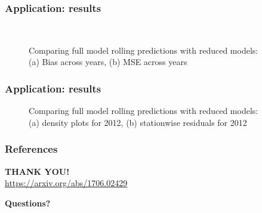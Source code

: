 \documentclass[10pt]{beamer}
\theoremstyle{definition}
\newcommand{\colubf}{\color{UniBlue}\bf}
\begin{document}

\begin{frame}
\frametitle{Application: results}

\begin{figure}[t]
\captionsetup{justification=centering, font=footnotesize}
\begin{center}
\\
\caption{Comparing full model rolling predictions with reduced models:\\
(a) Bias across years, (b) MSE across years}
\label{fig:prepost1}
\end{center}
\end{figure}
\end{frame}


\begin{frame}
\frametitle{Application: results}

\begin{figure}[t]
	\captionsetup{justification=centering, font=footnotesize}
	\begin{center}
		\caption{Comparing full model rolling predictions with reduced models:\\
		(a) density plots for 2012, (b) stationwise residuals for 2012}
		\label{fig:prepost2}
	\end{center}
\end{figure}
\end{frame}


\begin{frame}
\frametitle{References}

{\scriptsize


}
\end{frame}


\begin{frame}
\centering
{\huge\textcolor{UniBlue}{\textbf{THANK YOU!}}}\\

\vspace{2em}
{\colbbf \url{https://arxiv.org/abs/1706.02429}}

\vspace{1em}
{\colubf Questions?}
\end{frame}
\end{document}
